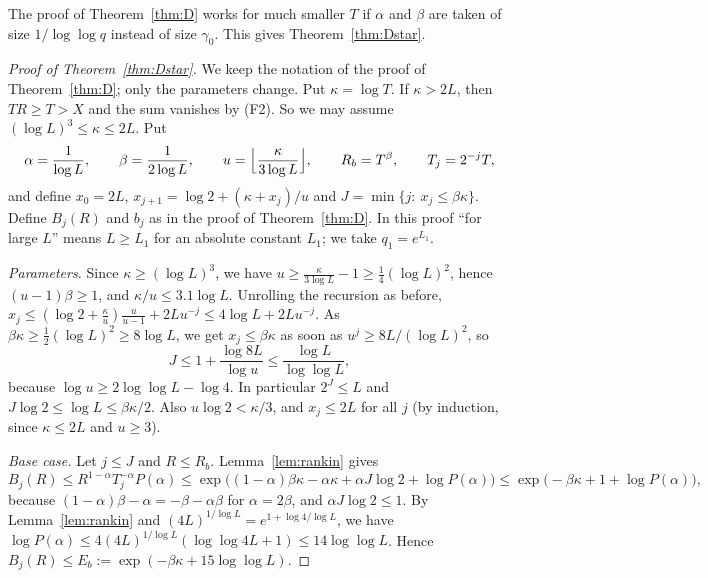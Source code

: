 The proof of Theorem~\ref{thm:D} works for much smaller $T$ if $\alpha$ and $\beta$ are taken of size $1/\log\log q$
instead of size $\gamma_0$. This gives Theorem~\ref{thm:Dstar}.

\begin{proof}[Proof of Theorem~\ref{thm:Dstar}]
We keep the notation of the proof of Theorem~\ref{thm:D}; only the parameters change. Put $\kappa=\log T$. If
$\kappa>2L$, then $TR\ge T>X$ and the sum vanishes by (F2). So we may assume $(\log L)^3\le\kappa\le2L$. Put
\[
\alpha=\frac1{\log L},\qquad\beta=\frac1{2\log L},\qquad u=\Bigl\lfloor\frac\kappa{3\log L}\Bigr\rfloor,\qquad
R_b=T^\beta,\qquad T_j=2^{-j}T,
\]
and define $x_0=2L$, $x_{j+1}=\log2+(\kappa+x_j)/u$ and $J=\min\{j:\ x_j\le\beta\kappa\}$. Define $B_j(R)$ and $b_j$
as in the proof of Theorem~\ref{thm:D}. In this proof ``for large $L$'' means $L\ge L_1$ for an absolute constant
$L_1$; we take $q_1=e^{L_1}$.

\emph{Parameters.} Since $\kappa\ge(\log L)^3$, we have $u\ge\frac{\kappa}{3\log L}-1\ge\frac14(\log L)^2$, hence
$(u-1)\beta\ge1$, and $\kappa/u\le3.1\log L$. Unrolling the recursion as before,
$x_j\le(\log2+\frac\kappa u)\frac u{u-1}+2Lu^{-j}\le4\log L+2Lu^{-j}$. As $\beta\kappa\ge\frac12(\log L)^2\ge8\log L$,
we get $x_j\le\beta\kappa$ as soon as $u^j\ge8L/(\log L)^2$, so
\[
J\le1+\frac{\log8L}{\log u}\le\frac{\log L}{\log\log L},
\]
because $\log u\ge2\log\log L-\log4$. In particular $2^J\le L$ and $J\log2\le\log L\le\beta\kappa/2$. Also
$u\log2<\kappa/3$, and $x_j\le2L$ for all $j$ (by induction, since $\kappa\le2L$ and $u\ge3$).

\emph{Base case.} Let $j\le J$ and $R\le R_b$. Lemma~\ref{lem:rankin} gives
\[
B_j(R)\le R^{1-\alpha}T_j^{-\alpha}P(\alpha)\le\exp\bigl((1-\alpha)\beta\kappa-\alpha\kappa+\alpha J\log2+\log
P(\alpha)\bigr)\le\exp\bigl(-\beta\kappa+1+\log P(\alpha)\bigr),
\]
because $(1-\alpha)\beta-\alpha=-\beta-\alpha\beta$ for $\alpha=2\beta$, and $\alpha J\log2\le1$. By
Lemma~\ref{lem:rankin} and $(4L)^{1/\log L}=e^{1+\log4/\log L}$, we have
$\log P(\alpha)\le4(4L)^{1/\log L}(\log\log4L+1)\le14\log\log L$. Hence $B_j(R)\le E_b:=\exp(-\beta\kappa+15\log\log L)$.


\end{proof}
